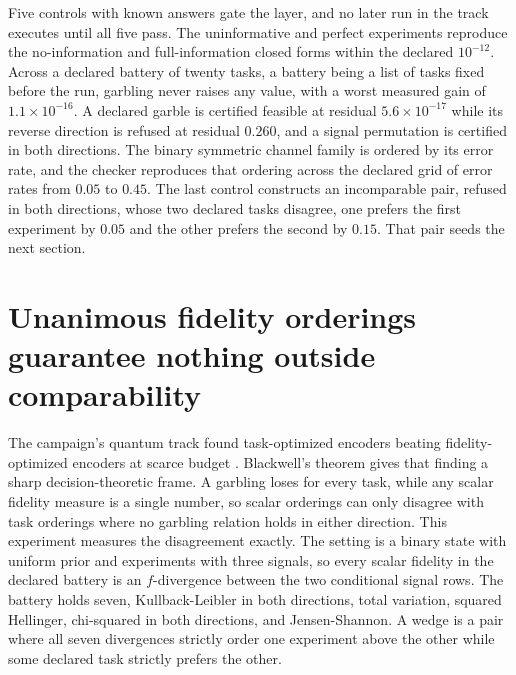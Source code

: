 \documentclass[aps,pre,reprint,nofootinbib]{revtex4-2}
\begin{document}
Five controls with known answers gate the layer, and no later run in
the track executes until all five pass.  The uninformative and
perfect experiments reproduce the no-information and full-information
closed forms within the declared $10^{-12}$.  Across a declared
battery of twenty tasks,
a battery being a list of tasks fixed before the run, garbling never
raises any value, with a worst measured gain of $1.1\times10^{-16}$.
A declared garble is certified feasible at residual
$5.6\times10^{-17}$ while its reverse direction is refused at
residual $0.260$, and a signal permutation is certified in both
directions.  The binary symmetric channel family is ordered by its
error rate, and the checker reproduces that ordering across the
declared grid of error rates from $0.05$ to $0.45$.  The last
control constructs an incomparable pair, refused in both directions,
whose two declared tasks disagree, one prefers the first experiment
by $0.05$ and the other prefers the second by $0.15$.  That pair
seeds the next section.

\section{Unanimous fidelity orderings guarantee nothing outside
comparability}
\label{sec:gd1}

The campaign's quantum track found task-optimized encoders beating
fidelity-optimized encoders at scarce budget \cite{QuantumPaper}.
Blackwell's theorem gives that finding a sharp decision-theoretic
frame.  A garbling loses for every task, while any scalar fidelity
measure is a single number, so scalar orderings can only disagree
with task orderings where no garbling relation holds in either
direction.  This experiment measures the disagreement exactly.  The
setting is a binary state with uniform prior and experiments with
three signals, so every scalar fidelity in the declared battery is an
$f$-divergence between the two conditional signal rows.  The battery
holds seven, Kullback-Leibler in both directions, total variation,
squared Hellinger, chi-squared in both directions, and
Jensen-Shannon.  A wedge is a pair where all seven divergences
strictly order one experiment above the other while some declared
task strictly prefers the other.
\end{document}
